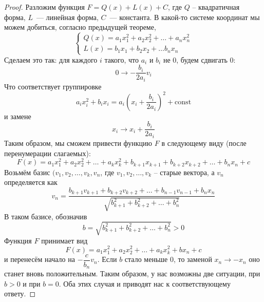 \documentclass[11pt]{article}
\begin{document}
\begin{remark}
    \begin{proof}
    Разложим функция $F = Q(x) + L(x) + C$, где $Q$ -- квадратичная форма, $L$~--- линейная форма, $C$~--- константа. В какой-то системе координат мы можем добиться, согласно предыдущей теореме,
    \begin{equation*}
    \begin{cases}
        Q(x) = a_1x_1^2 + a_2x_2^2 + \hdots + a_nx_n^2\\
        L(x) = b_1x_1 + b_2x_2 + \hdots b_nx_n
    \end{cases}
    \end{equation*}
    Сделаем это так: для каждого $i$ такого, что $a_i$ и $b_i$ не $0$, будем сдвигать $0$:
    \begin{equation*}
        0 \to -\dfrac{b_i}{2a_i}v_i
    \end{equation*}
    Что соответствует группировке
    \begin{equation*}
        a_ix_i^2 + b_ix_i = a_i(x_i + \dfrac{b_i}{2a_i})^2 + \text{const}
    \end{equation*}
    и замене
    \begin{equation*}
        x_i \to x_i + \dfrac{b_i}{2a_i}
    \end{equation*}
    Таким образом, мы сможем привести функцию $F$ в следующему виду (после перенумерации слагаемых):
    \begin{equation*}
        F(x) = a_1x_1^2 + a_2x_2^2 + \hdots + a_kx_k^2 + b_{k + 1}x_{k + 1} + b_{k + 2}x_{k + 2} + \hdots + b_nx_n + c
    \end{equation*}
    Возьмём базис $(v_1, v_2, \hdots, v_k, v_n$, где $v_1, v_2, \hdots, v_k$ -- старые вектора, а $v_n$ определяется как
    \begin{equation*}
        v_n = \dfrac{b_{k + 1}v_{k+1} + b_{k + 2}v_{k + 2} + \hdots + b_{n - 1}v_{n - 1} + b_{n}x_n}{\sqrt{b_{k+1}^2 + b_{k+2}^2 + \hdots + b_{n}^2}}
    \end{equation*}
    В таком базисе, обозначив
    \begin{equation*}
        b = \sqrt{b_{k+1}^2 + b_{k+2}^2 + \hdots + b_{n}^2} > 0
    \end{equation*}
    Функция $F$ принимает вид
    \begin{equation*}
        F(x) = a_1x_1^2 + a_2x_2^2 + \hdots + a_kx_k^2 + bx_n + c
    \end{equation*}
    и перенесём начало на $-\dfrac{c}{b_n}v_n$. Если $b$ стало меньше $0$, то заменой $x_n \to -x_n$ оно станет вновь положительным. Таким образом, у нас возможны две ситуации, при $b > 0$ и при $b = 0$. Оба этих случая и приводят нас к соответствующему ответу.
    \end{proof}


\end{remark}
\end{document}
